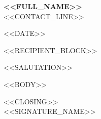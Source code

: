 \documentclass[11pt,letterpaper]{article}
\begin{document}
{\large\bfseries <<FULL_NAME>>}\\[0.15em]
<<CONTACT_LINE>>

\vspace{1.4em}

<<DATE>>

\vspace{1.0em}

<<RECIPIENT_BLOCK>>

\vspace{1.0em}

<<SALUTATION>>

<<BODY>>

\vspace{0.6em}

<<CLOSING>>\\[1.6em]
<<SIGNATURE_NAME>>
\end{document}

